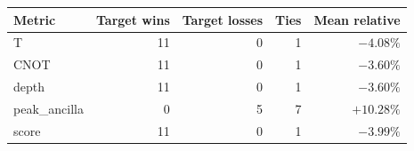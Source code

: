 \begin{tabular}{lrrrr}
\toprule
Metric & Target wins & Target losses & Ties & Mean relative \\
\midrule
T & 11 & 0 & 1 & $-4.08\%$ \\
CNOT & 11 & 0 & 1 & $-3.60\%$ \\
depth & 11 & 0 & 1 & $-3.60\%$ \\
peak_ancilla & 0 & 5 & 7 & $+10.28\%$ \\
score & 11 & 0 & 1 & $-3.99\%$ \\
\bottomrule
\end{tabular}
